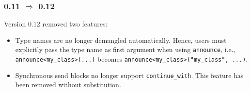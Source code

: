 \clearpage
\subsubsection{0.11 $\Rightarrow$ 0.12}

Version 0.12 removed two features:

\begin{itemize}
\item
Type names are no longer demangled automatically.
Hence, users must explicitly pass the type name as first argument when using \lstinline^announce^, i.e., \lstinline^announce<my_class>(...)^ becomes \lstinline^announce<my_class>("my_class", ...)^.

\item
Synchronous send blocks no longer support \lstinline^continue_with^.
This feature has been removed without substitution.
\end{itemize}

